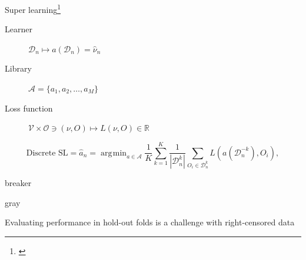 \documentclass[smaller]{beamer}\usepackage{listings}
\newcommand{\R}{\mathbb{R}}
\newcommand{\1}{\mathds{1}}
\DeclareMathOperator*{\argmin}{\arg\!\min}
\begin{document}
\begin{frame}[label={sec:org8577a4f}]{Super learning\footnote{\cite{stone1974cross,geisser1975predictive,wolpert1992stacked,breiman1996stacked,van2007super}}}
\begin{onlyenv}
\begin{center}
\end{center}
\end{onlyenv}

\begin{block}{\color{white}{dummy}}
\begin{description}
\item[{Learner}] \(\mathcal{D}_n \longmapsto a(\mathcal{D}_n) = \hat
  \nu_n\)
\item[{Library}] \(\mathcal{A} = \{a_1, a_2, \dots, a_M \}\)
\item[{Loss function}] \(\mathcal{V} \times \mathcal{O} \ni (\nu,
  O) \longmapsto L(\nu, O) \in \R\)
\end{description}

\begin{equation*}
  \text{Discrete SL} = \hat{a}_n = \argmin_{a \in \mathcal{A}}
  \frac{1}{K}\sum_{k=1}^{K}
  \frac{1}{| \mathcal{D}_n^{k} |}\sum_{O_i \in \mathcal{D}_n^{k}}
  L
  {
    \left(
      a{ (\mathcal{D}_n^{-k})}
      , O_i
    \right)
  },
\end{equation*}
\end{block}
\end{frame}

\begin{frame}[label={sec:org0266a17}]{\color{white} breaker}
\begin{beamercolorbox}[rounded=true]{gray}
\Large

\begin{center}
  Evaluating performance in hold-out folds is a challenge
  with right-censored data
\end{center}
\vspace{.2cm}
\end{beamercolorbox}
\end{frame}
\end{document}
